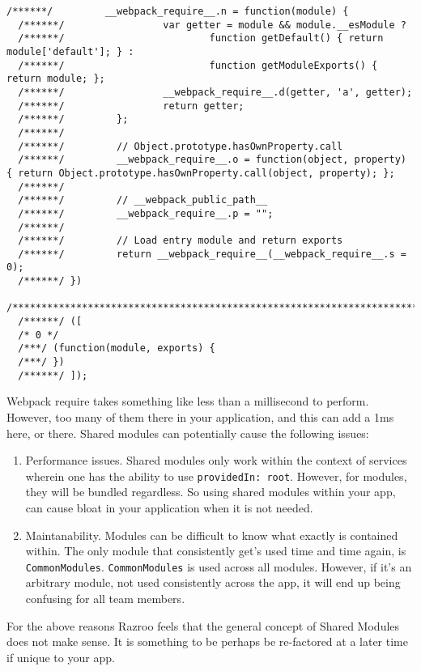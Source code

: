 \begin{lstlisting}[caption=webpack require source code]
  /******/         __webpack_require__.n = function(module) {
  /******/                 var getter = module && module.__esModule ?
  /******/                         function getDefault() { return module['default']; } :
  /******/                         function getModuleExports() { return module; };
  /******/                 __webpack_require__.d(getter, 'a', getter);
  /******/                 return getter;
  /******/         };
  /******/
  /******/         // Object.prototype.hasOwnProperty.call
  /******/         __webpack_require__.o = function(object, property) { return Object.prototype.hasOwnProperty.call(object, property); };
  /******/
  /******/         // __webpack_public_path__
  /******/         __webpack_require__.p = "";
  /******/
  /******/         // Load entry module and return exports
  /******/         return __webpack_require__(__webpack_require__.s = 0);
  /******/ })
  /************************************************************************/
  /******/ ([
  /* 0 */
  /***/ (function(module, exports) {
  /***/ })
  /******/ ]);  
\end{lstlisting}

Webpack require takes something like less than a millisecond to perform. 
However, too many of them there in your application, and this can add a 1ms
here, or there. Shared modules can potentially cause the following issues: 
\begin{enumerate}
  \item Performance issues. Shared modules only work within the context of 
services wherein one has the ability to use \lstinline{providedIn: root}. 
However, for modules, they will be bundled regardless. So using shared 
modules within your app, can cause bloat in your application when it is 
not needed. 
  \item Maintanability. Modules can be difficult to know what exactly is 
  contained within. The only module that consistently get's used time and time
  again, is \lstinline{CommonModules}. \lstinline{CommonModules} is used 
  across all modules. However, if it's an arbitrary module, not used
  consistently across the app, it will end up being confusing for all team
  members. 
\end{enumerate}

For the above reasons Razroo feels that the general concept of Shared Modules
does not make sense. It is something to be perhaps be re-factored at a later
time if unique to your app. 
